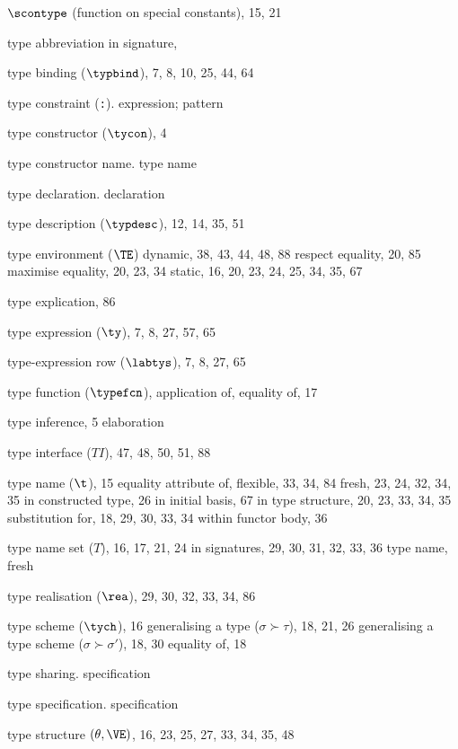 \begin{theindex}
\item $\scontype$ (function on special constants), 15, 21
\item type abbreviation in signature, \typabbrinsigsrefs
\item type binding ($\typbind$),  7, 8, 10, 25, 44, 64
\item type constraint (\verb+:+). \see expression; pattern
\item type constructor ($\tycon$), 4
\item type constructor name. \see type name
\item type declaration. \see declaration
\item type description ($\typdesc$), 12, 14, 35, 51
\item type environment ($\TE$)
\subitem dynamic, 38,  43, 44, 48, 88
\subitem respect equality, 20, 85
\subitem maximise equality, 20, 23, 34
\subitem static, 16, 20, 23, 24, 25, 34, 35, 67
\item type explication, 86
\item type expression ($\ty$), 7, 8, 27, 57, 65
\item type-expression row ($\labtys$), 7, 8, 27, 65
\item type function ($\typefcn$), \Lambdarefs
\subitem application of, \typefunctionrefs
\subitem equality of, 17
\item type inference, 5
\subitem \seealso elaboration
\item type interface ($T\!I$), 47, 48, 50, 51, 88
\item type name ($\t$), 15
\subitem equality attribute of, \eqtynamerefs
\subitem flexible, 33, 34, 84
\subitem fresh, 23, 24, 32, 34, 35
\subitem in constructed type, 26
\subitem in initial basis, 67
\subitem in type structure, 20, 23, 33, 34, 35
\subitem substitution for, 18, 29, 30, 33, 34
\subitem within functor body, 36
\item type name set ($T$), 16, 17, 21, 24
\subitem in signatures,  29, 30, 31, 32, 33, 36
\subitem \seealso type name, fresh
\item type realisation ($\rea$), 29, 30, 32, 33, 34, 86
\item type scheme ($\tych$), 16
\subitem generalising a type ($\sigma\succ\tau$), 18, 21, 26
\subitem generalising a type scheme ($\sigma\succ\sigma'$), 18, 30
\subitem equality of, 18
\item type sharing. \see specification
\item type specification. \see specification
\item type structure $(\theta,\VE)$, 16, 23, 25, 27, 33, 34, 35, 48

\end{theindex}
